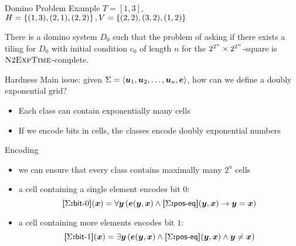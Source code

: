 \documentclass{beamer}
\begin{document}
\begin{frame}{Domino Problem}
Example $T = [1,3]$, $H = \left\{(1,3),(2,1),(2,2)\right\}, V = \left\{(2,2),(3,2),(1,2)\right\}$

\centering
{}

\begin{theorem}
There is a domino system $D_0$ such that the problem of asking if there exists a
tiling for $D_0$ with initial condition $c_0$ of length $n$ for the
$2^{2^n}\times 2^{2^n}$-square is $\text{\normalfont{\scshape N}}2\text{\normalfont{\scshape ExpTime}}$-complete.
\end{theorem}
\end{frame}

\begin{frame}{Hardness}
Main issue: given $\Sigma = \left\langle \bm{u}_{1},\bm{u}_{2},\dots,\bm{u}_{u},\bm{e} \right\rangle$,
how can we define a doubly exponential grid?
\pause
\begin{itemize}
  \item
  Each class can contain exponentially many cells
  
  \item
  If we encode bits in cells, the classes encode doubly exponential numbers
\end{itemize}
\end{frame}

\begin{frame}{Encoding}
\begin{itemize}
  \item
  we can ensure that every class contains maximally many $2^u$ cells
  
  \item
  a cell containing a single element encodes bit $0$:
  \[
    {\bm{[}\Sigma\mathord{\bm{:}}\mathsf{bit}{\hbox{-}}0\bm{]}}(\bm{x}) = \forall\bm{y} \left(
    \bm{e}(\bm{y},\bm{x}) \land {\bm{[}\Sigma\mathord{\bm{:}}\mathsf{pos}{\hbox{-}}\mathsf{eq}\bm{]}}(\bm{y},\bm{x}) \rightarrow \bm{y} = \bm{x}\right)
  \] 
  
  \item
  a cell containing more elements encodes bit $1$:
  \[
    {\bm{[}\Sigma\mathord{\bm{:}}\mathsf{bit}{\hbox{-}}1\bm{]}}(\bm{x}) = \exists\bm{y} \left(
    \bm{e}(\bm{y},\bm{x}) \land {\bm{[}\Sigma\mathord{\bm{:}}\mathsf{pos}{\hbox{-}}\mathsf{eq}\bm{]}}(\bm{y},\bm{x}) \land \bm{y} \neq \bm{x}\right)
  \]
\end{itemize}
\end{frame}
\end{document}
